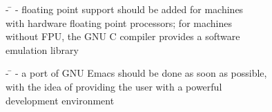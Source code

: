 \begin{slide}{}
{\begin{tabbing}
\hspace{1cm} - \= \kill
\hspace{1cm} - floating point support should be added for machines\\
\> with hardware floating point processors; for machines\\
\> without FPU, the GNU C compiler provides a software\\
\> emulation library
\end{tabbing}

\begin{tabbing}
\hspace{1cm} - \= \kill
\hspace{1cm} - a port of GNU Emacs should be done as soon as possible,\\
\> with the idea of providing the user with a powerful\\
\> development environment
\end{tabbing}

}

\end{slide}
